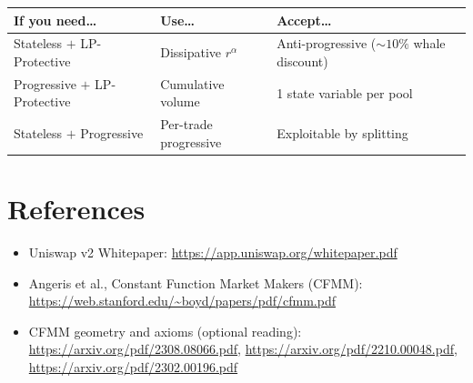 \documentclass[11pt]{article}
\theoremstyle{definition}
\theoremstyle{remark}
\begin{document}
\begin{center}
\begin{tabular}{@{}p{4.5cm}p{4cm}p{6cm}@{}}
\toprule
\textbf{If you need\ldots} & \textbf{Use\ldots} & \textbf{Accept\ldots} \\
\midrule
Stateless $+$ LP-Protective & Dissipative $r^\alpha$ & Anti-progressive ($\sim\!10\%$ whale discount) \\
\addlinespace
Progressive $+$ LP-Protective & Cumulative volume & 1 state variable per pool \\
\addlinespace
Stateless $+$ Progressive & Per-trade progressive & Exploitable by splitting \\
\bottomrule
\end{tabular}
\end{center}

\section*{References}
\begin{itemize}
\item Uniswap v2 Whitepaper: \url{https://app.uniswap.org/whitepaper.pdf}
\item Angeris et al., Constant Function Market Makers (CFMM): \url{https://web.stanford.edu/~boyd/papers/pdf/cfmm.pdf}
\item CFMM geometry and axioms (optional reading):
\url{https://arxiv.org/pdf/2308.08066.pdf}, \url{https://arxiv.org/pdf/2210.00048.pdf}, \url{https://arxiv.org/pdf/2302.00196.pdf}
\end{itemize}
\end{document}
